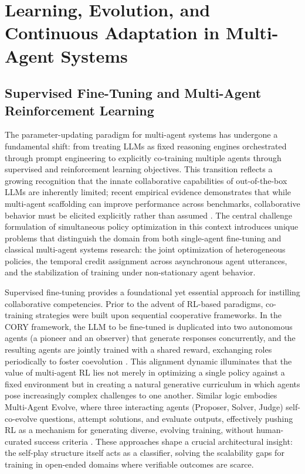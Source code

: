 \documentclass[11pt,a4paper]{article}
\begin{document}
\section{Learning, Evolution, and Continuous Adaptation in Multi-Agent Systems}



\subsection{Supervised Fine-Tuning and Multi-Agent Reinforcement Learning}


The parameter-updating paradigm for multi-agent systems has undergone a fundamental shift: from treating LLMs as fixed reasoning engines orchestrated through prompt engineering to explicitly co-training multiple agents through supervised and reinforcement learning objectives. This transition reflects a growing recognition that the innate collaborative capabilities of out-of-the-box LLMs are inherently limited; recent empirical evidence demonstrates that while multi-agent scaffolding can improve performance across benchmarks, collaborative behavior must be elicited explicitly rather than assumed \cite{arxiv:2502.18439v2,arxiv:2505.21298v4}. The central challenge formulation of simultaneous policy optimization in this context introduces unique problems that distinguish the domain from both single-agent fine-tuning and classical multi-agent systems research: the joint optimization of heterogeneous policies, the temporal credit assignment across asynchronous agent utterances, and the stabilization of training under non-stationary agent behavior.

Supervised fine-tuning provides a foundational yet essential approach for instilling collaborative competencies. Prior to the advent of RL-based paradigms, co-training strategies were built upon sequential cooperative frameworks. In the CORY framework, the LLM to be fine-tuned is duplicated into two autonomous agents (a pioneer and an observer) that generate responses concurrently, and the resulting agents are jointly trained with a shared reward, exchanging roles periodically to foster coevolution \cite{arxiv:2410.06101v2}. This alignment dynamic illuminates that the value of multi-agent RL lies not merely in optimizing a single policy against a fixed environment but in creating a natural generative curriculum in which agents pose increasingly complex challenges to one another. Similar logic embodies Multi-Agent Evolve, where three interacting agents (Proposer, Solver, Judge) self-co-evolve questions, attempt solutions, and evaluate outputs, effectively pushing RL as a mechanism for generating diverse, evolving training, without human-curated success criteria \cite{arxiv:2510.23595v3}. These approaches shape a crucial architectural insight: the self-play structure itself acts as a classifier, solving the scalability gaps for training in open-ended domains where verifiable outcomes are scarce.
\end{document}
